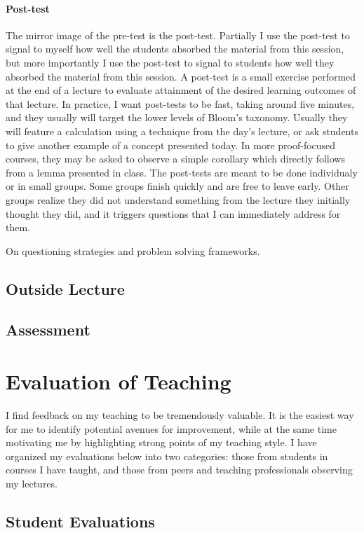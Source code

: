 \documentclass{article}
\begin{document}
\paragraph{Post-test}The mirror image of the pre-test is the post-test. Partially I use the post-test to signal to myself how well the students absorbed the material from this session, but more importantly I use the post-test to signal to students how well they absorbed the material from this session. A post-test is a small exercise performed at the end of a lecture to evaluate attainment of the desired learning outcomes of that lecture. In practice, I want post-tests to be fast, taking around five minutes, and they usually will target the lower levels of Bloom's taxonomy. Usually they will feature a calculation using a technique from the day's lecture, or ask students to give another example of a concept presented today. In more proof-focused courses, they may be asked to observe a simple corollary which directly follows from a lemma presented in class. The post-tests are meant to be done individualy or in small groups. Some groups finish quickly and are free to leave early. Other groups realize they did not understand something from the lecture they initially thought they did, and it triggers questions that I can immediately address for them.

On questioning strategies and problem solving frameworks.

\subsection{Outside Lecture}

\subsection{Assessment}
\section{Evaluation of Teaching}
I find feedback on my teaching to be tremendously valuable. It is the easiest way for me to identify potential avenues for improvement, while at the same time motivating me by highlighting strong points of my teaching style. I have organized my evaluations below into two categories: those from students in courses I have taught, and those from peers and teaching professionals observing my lectures.
\subsection{Student Evaluations}
\end{document}
